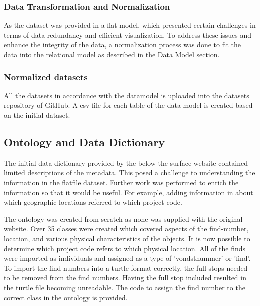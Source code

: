 \subsubsection{Data Transformation and Normalization}
As the dataset was provided in a flat model, which presented certain challenges in terms of data redundancy and efficient visualization. To address these issues and enhance the integrity of the data, a normalization process was done to fit the data into the relational model as described in the Data Model section.

\subsubsection{Normalized datasets}
All the datasets in accordance with the datamodel is uploaded into the datasets repository of GitHub. A csv file for each table of the data model is created based on the initial dataset.

\subsection{Ontology and Data Dictionary}
The initial data dictionary provided by the below the surface website contained limited descriptions of the metadata. This posed a challenge to understanding the information in the flatfile dataset.  Further work was performed to enrich the information so that it would be useful.  For example, adding information in about which geographic locations referred to which project code.

The ontology was created from scratch as none was supplied with the original website.  Over 35 classes were created which covered aspects of the find-number, location, and various physical characteristics of the objects.  It is now possible to determine which project code refers to which physical location.  All of the finds were imported as individuals and assigned as a type of 'vondstnummer' or 'find'.  To import the find numbers into a turtle format correctly, the full stops needed to be removed from the find numbers.  Having the full stop included resulted in the turtle file becoming unreadable. The code to assign the find number to the correct class in the ontology is provided.    
